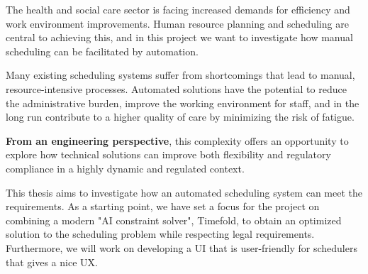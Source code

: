 \documentclass[nomenclature, english, bibtex]{kththesis}
\begin{document}

The health and social care sector is facing increased demands for efficiency and work environment improvements. Human resource planning and scheduling are central to achieving this, and in this project we want to investigate how manual scheduling can be facilitated by automation. 


Many existing scheduling systems suffer from shortcomings that lead to manual, resource-intensive processes. Automated solutions have the potential to reduce the administrative burden, improve the working environment for staff, and in the long run contribute to a higher quality of care by minimizing the risk of fatigue. \cite{bergstedt_schemagi_nodate} \cite{ronnberg_automating_2010} 

\textbf{From an engineering perspective}, this complexity offers an opportunity to explore how technical solutions can improve both flexibility and regulatory compliance in a highly dynamic and regulated context. \cite{socialstyrelsen_2025_planeringsstod} 



This thesis aims to investigate how an automated scheduling system can meet the requirements. As a starting point, we have set a focus for the project on combining a modern "AI constraint solver", Timefold, to obtain an optimized solution to the scheduling problem while respecting legal requirements. Furthermore, we will work on developing a \gls{UI} that is user-friendly for schedulers that gives a nice \gls{UX}.
\end{document}
